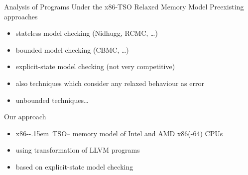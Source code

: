 \documentclass[aspectratio=169, fi]{paradise-slide}
\newcommand{\xtso}{\mbox{x86-\kern-.15em TSO}\xspace}
\begin{document}
\begin{frame}{Analysis of Programs Under the x86-TSO Relaxed Memory Model}
  Preexisting approaches
  \begin{itemize}
    \item stateless model checking (Nidhugg, RCMC, …)
    \item bounded model checking (CBMC, …)
    \item explicit-state model checking (not very competitive)
    \item also techniques which consider any relaxed behaviour as error
    \item unbounded techniques…
  \end{itemize}
  \pause

  \bigskip
  Our approach
  \begin{itemize}
    \item \xtso – memory model of Intel and AMD x86(-64) CPUs
    \item using transformation of LLVM programs
    \item based on explicit-state model checking
  \end{itemize}
\end{frame}
\end{document}
